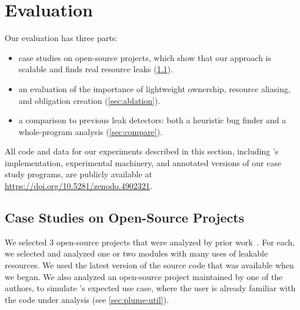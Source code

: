 \section{Evaluation}
\label{sec:evaluation}

Our evaluation has three parts:
\begin{itemize}
\item case studies on open-source projects, which show that our approach
  is scalable and finds real resource leaks (\cref{sec:case-studies}).
\item an evaluation of the importance of
  lightweight ownership, %
  resource aliasing, %
  and obligation creation %
  (\cref{sec:ablation}).
\item a comparison to previous leak detectors:  both a heuristic bug finder
  and a whole-program
  analysis (\cref{sec:compare}).
\end{itemize}


All code and data for our experiments described
in this section, including \tool's implementation, experimental
machinery, and annotated versions of our case study programs,
are publicly available at \url{https://doi.org/10.5281/zenodo.4902321}.

\subsection{Case Studies on Open-Source Projects}
\label{sec:case-studies}

We selected 3 open-source projects that were analyzed by prior work~\cite{zuo2019grapple}.
For each, we selected and analyzed one or two modules
with many uses of leakable resources. We used
the latest version of the source code that was available
when we began. We also analyzed an open-source project
maintained by one of the authors, to simulate \tool's
expected use case, where the user is already familiar with the
code under analysis (see \cref{sec:plume-util}).

